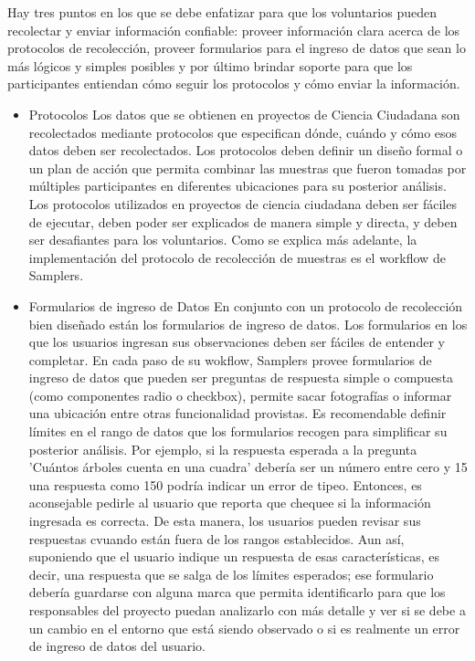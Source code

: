 	Hay tres puntos en los que se debe enfatizar para que los voluntarios pueden recolectar y enviar información confiable: proveer información clara acerca de los protocolos de recolección, proveer formularios para el ingreso de datos que sean lo más lógicos y simples posibles y por último brindar soporte para que los participantes entiendan cómo seguir los protocolos y cómo enviar la información.\cite{bonney2009citizen}

\begin{itemize}
	\item {Protocolos}	
			Los datos que se obtienen en proyectos de Ciencia Ciudadana son recolectados mediante protocolos que especifican dónde, cuándo y cómo esos datos deben ser recolectados. Los protocolos deben definir un diseño formal o un plan de acción que permita combinar las muestras que fueron tomadas por múltiples participantes en diferentes ubicaciones para su posterior análisis. Los protocolos utilizados en proyectos de ciencia ciudadana deben ser fáciles de ejecutar, deben poder ser explicados de manera simple y directa, y deben ser desafiantes para los voluntarios.\cite{bonney2009citizen}
		Como se explica más adelante, la implementación del protocolo de recolección de muestras es el workflow de Samplers.
		
	\item {Formularios de ingreso de Datos}	
			En conjunto con un protocolo de recolección bien diseñado están los formularios de ingreso de datos. Los formularios en los que los usuarios ingresan sus observaciones deben ser fáciles de entender y completar. En cada paso de su wokflow, Samplers provee formularios de ingreso de datos que pueden ser preguntas de respuesta simple o compuesta (como componentes radio o checkbox), permite sacar fotografías o informar una ubicación entre otras funcionalidad provistas. 
			Es recomendable definir límites en el rango de datos que los formularios recogen para simplificar su posterior análisis. Por ejemplo, si la respuesta esperada a la pregunta 'Cuántos árboles cuenta en una cuadra' debería ser un número entre cero y 15 una respuesta como 150 podría indicar un error de tipeo. Entonces, es aconsejable pedirle al usuario que reporta que chequee si la información ingresada es correcta. De esta manera, los usuarios pueden revisar sus respuestas cvuando están fuera de los rangos establecidos. Aun así, suponiendo que el usuario indique un respuesta de esas características, es decir, una respuesta que se salga de los límites esperados; ese formulario debería guardarse con alguna marca que permita identificarlo para que los responsables del proyecto puedan analizarlo con más detalle y ver si se debe a un cambio en el entorno que está siendo observado o si es realmente un error de ingreso de datos del usuario.
			

\end{itemize}
